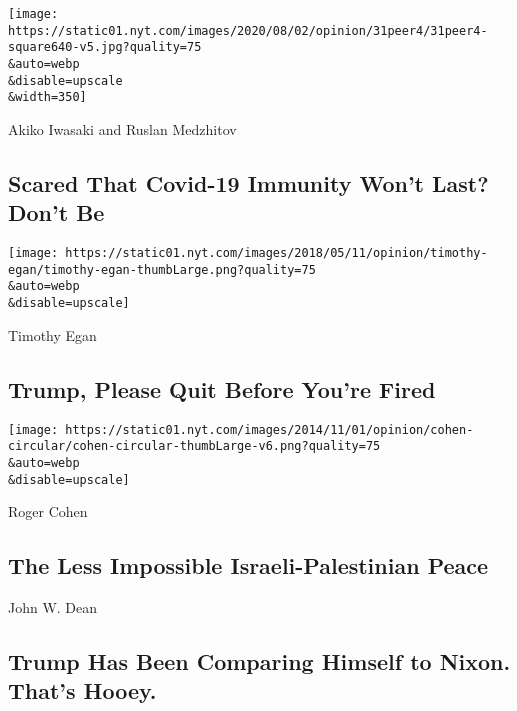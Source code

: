 \texttt{[image: https://static01.nyt.com/images/2020/08/02/opinion/31peer4/31peer4-square640-v5.jpg?quality=75\\\&auto=webp\\\&disable=upscale\\\&width=350]}

\href{/2020/07/31/opinion/coronavirus-antibodies-immunity.html}{}

Akiko Iwasaki and Ruslan Medzhitov

\hypertarget{scared-that-covid-19-immunity-wont-last-dont-be}{%
\subsection{Scared That Covid-19 Immunity Won't Last? Don't
Be}\label{scared-that-covid-19-immunity-wont-last-dont-be}}

\href{/2020/07/31/opinion/trump-resign.html}{}

\texttt{[image: https://static01.nyt.com/images/2018/05/11/opinion/timothy-egan/timothy-egan-thumbLarge.png?quality=75\\\&auto=webp\\\&disable=upscale]}

Timothy Egan

\hypertarget{trump-please-quit-before-youre-fired}{%
\subsection{Trump, Please Quit Before You're
Fired}\label{trump-please-quit-before-youre-fired}}

\href{/2020/07/31/opinion/israeli-palestinian-peace.html}{}

\texttt{[image: https://static01.nyt.com/images/2014/11/01/opinion/cohen-circular/cohen-circular-thumbLarge-v6.png?quality=75\\\&auto=webp\\\&disable=upscale]}

Roger Cohen

\hypertarget{the-less-impossible-israeli-palestinian-peace}{%
\subsection{The Less Impossible Israeli-Palestinian
Peace}\label{the-less-impossible-israeli-palestinian-peace}}

\href{/2020/07/31/opinion/trump-nixon-authoritarianism.html}{}

John W. Dean

\hypertarget{trump-has-been-comparing-himself-to-nixon-thats-hooey}{%
\subsection{Trump Has Been Comparing Himself to Nixon. That's
Hooey.}\label{trump-has-been-comparing-himself-to-nixon-thats-hooey}}

